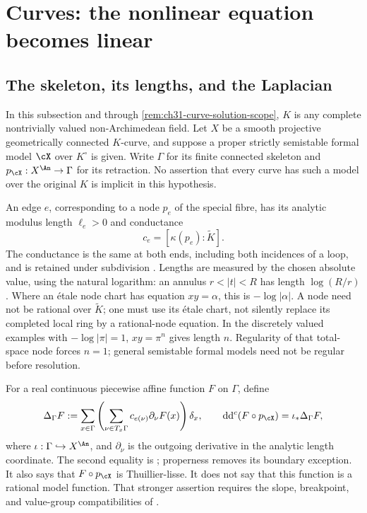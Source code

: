 \section{Curves: the nonlinear equation becomes linear}
\label{sec:ch31-curves}


\subsection{The skeleton, its lengths, and the Laplacian}
\label{sec:ch31-curve-setup}

In this subsection and through \cref{rem:ch31-curve-solution-scope},
\(K\) is any complete nontrivially valued non-Archimedean field.
Let \(X\) be a smooth projective geometrically connected \(K\)-curve,
and suppose a proper strictly semistable formal model \(\cX\) over
\(K^\circ\) is given.  Write \(\Gamma\) for its finite connected
skeleton and \(p_{\cX}:X^{\An}\to\Gamma\) for its retraction.
No assertion that every curve has such a model over the original
\(K\) is implicit in this hypothesis.

An edge \(e\), corresponding to a node \(p_e\) of the special fibre,
has its analytic modulus length \(\ell_e>0\) and conductance
\[
                    c_e=[\kappa(p_e):\widetilde K].
\]
The conductance is the same at both ends, including both incidences
of a loop, and is retained under subdivision
\cite[\S2.2.3, p.~41]{Thu05}.
Lengths are measured by the chosen absolute value, using the natural
logarithm: an annulus \(r<|t|<R\) has length \(\log(R/r)\).
Where an \'{e}tale node chart has equation \(xy=\alpha\), this is
\(-\log|\alpha|\).  A node need not be rational over \(\widetilde K\);
one must use its \'{e}tale chart, not silently replace its completed
local ring by a rational-node equation.  In the discretely valued
examples with \(-\log|\pi|=1\), \(xy=\pi^n\) gives length \(n\).
Regularity of that total-space node forces \(n=1\); general
semistable formal models need not be regular before resolution.

For a real continuous piecewise affine function \(F\) on \(\Gamma\),
define
\begin{equation}
\label{eq:ch31-graph-laplacian}
 \Delta_\Gamma F
   :=\sum_{x\in\Gamma}
       \left(\sum_{\nu\in T_x\Gamma}
              c_{e(\nu)}\partial_\nu F(x)\right)\delta_x,
 \qquad
 \mathrm d\mathrm d^c(F\circ p_{\cX})=\iota_*\Delta_\Gamma F ,
\end{equation}
where \(\iota:\Gamma\hookrightarrow X^{\An}\), and
\(\partial_\nu\) is the outgoing derivative in the analytic length
coordinate.  The second equality is
\cite[Theorem~3.2.10(ii)]{Thu05}; properness removes its boundary
exception.  It also says that \(F\circ p_{\cX}\) is Thuillier-lisse.
It does not say that this function is a rational model function.
That stronger assertion requires the slope, breakpoint, and value-group
compatibilities of \cite[Proposition~3.5]{GJKM19}.

